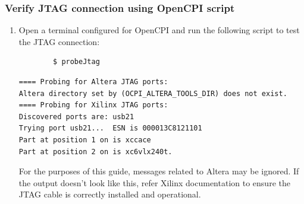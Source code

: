 \subsubsection{Verify JTAG connection using OpenCPI script}
\begin{enumerate}
\item Open a terminal configured for OpenCPI and run the following script to test the JTAG connection:
	\begin{verbatim}
		$ probeJtag
	\end{verbatim}
	\smallskip
	\begin{verbatim}
==== Probing for Altera JTAG ports:
Altera directory set by (OCPI_ALTERA_TOOLS_DIR) does not exist.
==== Probing for Xilinx JTAG ports:
Discovered ports are: usb21
Trying port usb21...  ESN is 000013C8121101
Part at position 1 on is xccace
Part at position 2 on is xc6vlx240t.
	\end{verbatim}
For the purposes of this guide, messages related to Altera may be ignored. If the output doesn't look like this, refer Xilinx documentation to ensure the JTAG cable is correctly installed and operational.
\end{enumerate}
\par\smallskip

